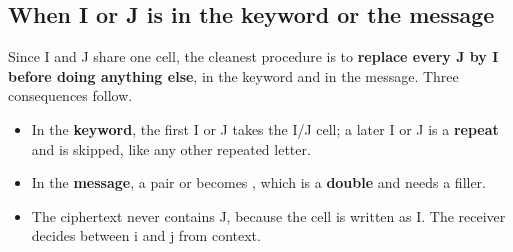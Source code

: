 \subsection{When I or J is in the keyword or the message \hot}
Since I and J share one cell, the cleanest procedure is to \textbf{replace every J by I before doing anything else}, in the keyword and in the message. Three consequences follow.
\begin{itemize}
  \item In the \textbf{keyword}, the first I or J takes the I/J cell; a later I or J is a \textbf{repeat} and is skipped, like any other repeated letter.
  \item In the \textbf{message}, a pair  or  becomes , which is a \textbf{double} and needs a filler.
  \item The ciphertext never contains J, because the cell is written as I. The receiver decides between i and j from context.
\end{itemize}

